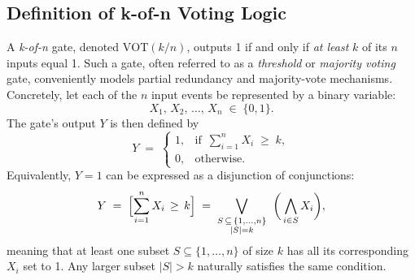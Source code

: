 \subsection{Definition of k-of-n Voting Logic}
\label{sec:kn_voting_logic_definition}

A \emph{k-of-n} gate, denoted \(\mathrm{VOT}(k/n)\), outputs 1 if and only if \emph{at least} \(k\) of its \(n\) inputs equal 1. Such a gate, often referred to as a \emph{threshold} or \emph{majority voting} gate, conveniently models partial redundancy and majority-vote mechanisms. Concretely, let each of the \(n\) input events be represented by a binary variable:
\[
X_1, \, X_2, \, \dots, \, X_n \;\in\;\{0,1\}.
\]
The gate's output \(Y\) is then defined by
\begin{equation}
\label{eq:kn_gate_boolean}
Y 
\;=\;
\begin{cases}
1, & \text{if }\, \displaystyle\sum_{i=1}^{n} X_i \;\ge\; k,\\[4pt]
0, & \text{otherwise}.
\end{cases}
\end{equation}
Equivalently, \(Y=1\) can be expressed as a disjunction of conjunctions:
\begin{equation}
\label{eq:k_of_n_or_of_ands}
Y 
\;=\;
\Bigl[\sum_{i=1}^{n} X_i \,\ge\, k\Bigr]
\;=\;
\bigvee_{\substack{S\,\subseteq\,\{1,\dots,n\}\\|S|=k}}
\;\;\biggl(\,\bigwedge_{i\in S} X_i\biggr),
\end{equation}
meaning that at least one subset \(S\subseteq \{1,\dots,n\}\) of size \(k\) has all its corresponding \(X_i\) set to 1. Any larger subset \(\lvert S\rvert > k\) naturally satisfies the same condition.

